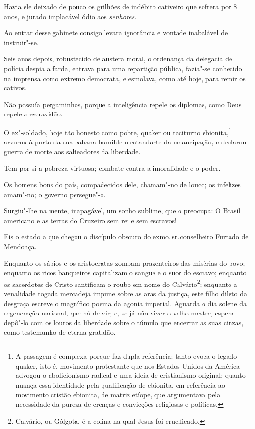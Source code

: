 Havia ele deixado de pouco os grilhões de indébito cativeiro que sofrera
por 8 anos, e jurado implacável ódio aos \emph{senhores}.

Ao entrar desse gabinete consigo levara ignorância e vontade inabalável
de instruir"-se.

Seis anos depois, robustecido de austera moral, o ordenança da delegacia
de polícia despia a farda, entrava para uma repartição pública, fazia"-se
conhecido na imprensa como extremo democrata, e esmolava, como até hoje,
para remir os cativos.

Não possuía pergaminhos, porque a inteligência repele os diplomas, como
Deus repele a escravidão.

O ex"-soldado, hoje tão honesto como pobre, quaker ou taciturno
ebionita,\footnote{A passagem é complexa porque faz dupla referência:
  tanto evoca o legado quaker, isto é, movimento protestante que nos
  Estados Unidos da América advogou o abolicionismo radical e uma ideia
  de cristianismo original; quanto nuança essa identidade pela
  qualificação de ebionita, em referência ao movimento cristão ebionita,
  de matriz etíope, que argumentava pela necessidade da pureza de
  crenças e convicções religiosas e políticas.} arvorou à porta da sua
cabana humilde o estandarte da emancipação, e declarou guerra de morte
aos salteadores da liberdade.

Tem por si a pobreza virtuosa; combate contra a imoralidade e o poder.

Os homens bons do país, compadecidos dele, chamam"-no de louco; os
infelizes amam"-no; o governo persegue"-o.

Surgiu"-lhe na mente, inapagável, um sonho sublime, que o preocupa: O
Brasil americano e as terras do Cruzeiro sem rei e sem escravos!

Eis o estado a que chegou o discípulo obscuro do exmo.\,sr.\,conselheiro
Furtado de Mendonça.

Enquanto os sábios e os aristocratas zombam prazenteiros das misérias do
povo; enquanto os ricos banqueiros capitalizam o sangue e o suor do
escravo; enquanto os sacerdotes de Cristo santificam o roubo em nome do
Calvário\footnote{Calvário, ou Gólgota, é a colina na qual Jesus foi
  crucificado.}; enquanto a
venalidade togada mercadeja impune sobre as aras da justiça, este filho
dileto da desgraça escreve o magnífico poema da agonia imperial. Aguarda
o dia solene da regeneração nacional, que há de vir; e, se já não viver
o velho mestre, espera depô"-lo com os louros da liberdade sobre o túmulo
que encerrar as suas cinzas, como testemunho de eterna gratidão.

